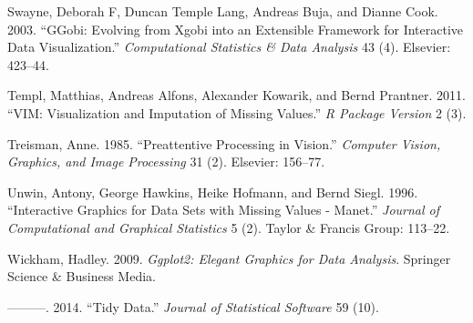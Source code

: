 \documentclass[]{article}
\begin{document}
\hypertarget{ref-swayne2003ggobi}{}
Swayne, Deborah F, Duncan Temple Lang, Andreas Buja, and Dianne Cook.
2003. ``GGobi: Evolving from Xgobi into an Extensible Framework for
Interactive Data Visualization.'' \emph{Computational Statistics \& Data
Analysis} 43 (4). Elsevier: 423--44.

\hypertarget{ref-vim}{}
Templ, Matthias, Andreas Alfons, Alexander Kowarik, and Bernd Prantner.
2011. ``VIM: Visualization and Imputation of Missing Values.'' \emph{R
Package Version} 2 (3).

\hypertarget{ref-treisman1985}{}
Treisman, Anne. 1985. ``Preattentive Processing in Vision.''
\emph{Computer Vision, Graphics, and Image Processing} 31 (2). Elsevier:
156--77.

\hypertarget{ref-Unwin1996}{}
Unwin, Antony, George Hawkins, Heike Hofmann, and Bernd Siegl. 1996.
``Interactive Graphics for Data Sets with Missing Values - Manet.''
\emph{Journal of Computational and Graphical Statistics} 5 (2). Taylor
\& Francis Group: 113--22.

\hypertarget{ref-wickham2009ggplot2}{}
Wickham, Hadley. 2009. \emph{Ggplot2: Elegant Graphics for Data
Analysis}. Springer Science \& Business Media.

\hypertarget{ref-wickham2014}{}
---------. 2014. ``Tidy Data.'' \emph{Journal of Statistical Software}
59 (10).
\end{document}
